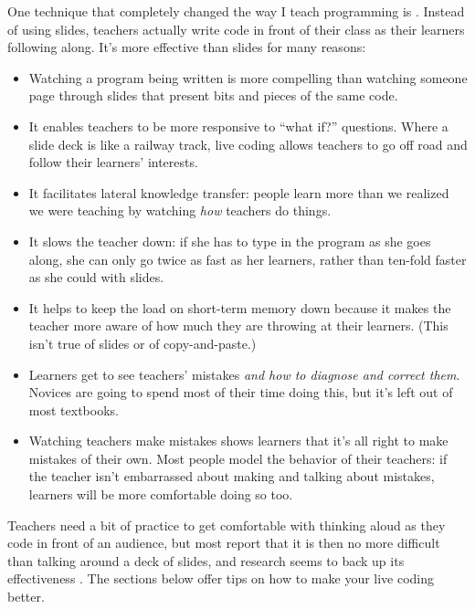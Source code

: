 One technique that completely changed the way I teach programming is
. Instead of using slides,
teachers actually write code in front of their class as their learners
following along. It's more effective than slides for many reasons:

\begin{itemize}

  \item
    Watching a program being written is more compelling than watching
    someone page through slides that present bits and pieces of the
    same code.

  \item
    It enables teachers to be more responsive to ``what if?''
    questions. Where a slide deck is like a railway track, live coding
    allows teachers to go off road and follow their learners'
    interests.

  \item
    It facilitates lateral knowledge transfer: people learn more than
    we realized we were teaching by watching \emph{how} teachers do
    things.

  \item
    It slows the teacher down: if she has to type in the program as
    she goes along, she can only go twice as fast as her learners,
    rather than ten-fold faster as she could with slides.

  \item
    It helps to keep the load on short-term memory down because it
    makes the teacher more aware of how much they are throwing at
    their learners. (This isn't true of slides or of copy-and-paste.)

  \item
    Learners get to see teachers' mistakes \emph{and how to diagnose
      and correct them}. Novices are going to spend most of their time
    doing this, but it's left out of most textbooks.

  \item
    Watching teachers make mistakes shows learners that it's all right
    to make mistakes of their own. Most people model the behavior of
    their teachers: if the teacher isn't embarrassed about making and
    talking about mistakes, learners will be more comfortable doing so
    too.

\end{itemize}

Teachers need a bit of practice to get comfortable with thinking aloud
as they code in front of an audience, but most report that it is then
no more difficult than talking around a deck of slides, and research
seems to back up its effectiveness \cite{Rubi2013,Haar2017}.  The
sections below offer tips on how to make your live coding better.

